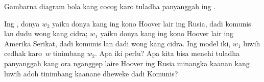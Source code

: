 \documentclass[../../../include/open-logic-section]{subfiles}
\begin{document}
\begin{prob}
Gambarna diagram bola kang cocog karo tuladha panyanggah ing
.
\end{prob}

\begin{prob}
  Ing , donya $w_2$ yaiku
  donya kang ing kono Hoover lair ing Rusia, dadi komunis lan
  dudu wong kang cidra; $w_1$ yaiku donya kang ing kono Hoover lair
  ing Amerika Serikat, dadi komunis lan dadi wong kang cidra.
  Ing model iki, $w_1$ luwih cedhak karo~$w$ tinimbang $w_2$.
  Apa iki perlu? Apa kita bisa menehi tuladha panyanggah kang
  ora nganggep laire Hoover ing Rusia minangka kaanan kang luwih
  adoh tinimbang kaanane dheweke dadi Komunis?
\end{prob}
\end{document}
